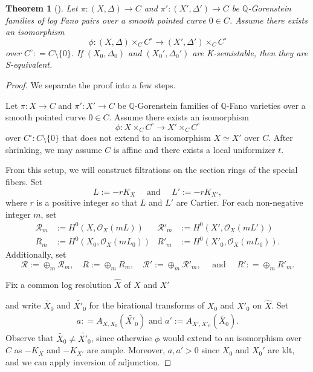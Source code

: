 \documentclass[12pt,reqno]{amsart}%
\newcommand{\cR}{{\mathcal{R}}}
\newtheorem{thm}{Theorem}[section]
\theoremstyle{definition}
\theoremstyle{remark}
\newcommand{\cO}{{\mathcal{O}}}
\newcommand{\Q}{{\mathbb{Q}}}
\begin{document}
\begin{thm}[{\cite{BX19}}]\label{t-main}
Let $\pi: (X,\Delta) \to C$ and $\pi': (X',\Delta')\to C$ be $\Q$-Gorenstein families of log Fano pairs over a smooth pointed curve $0 \in C$. Assume there exists an  isomorphism
\[
\phi: (X,\Delta) \times_C C^\circ  \to (X',\Delta') \times_C C^\circ
\] 
over $C^\circ\colon = C\setminus \{0 \}$.
If $(X_0,\Delta_0)$ and $(X_0',\Delta_0')$ are K-semistable, then they are S-equivalent.
\end{thm}
\begin{proof}We separate the proof into a few steps.
\medskip



Let  $\pi: X \to C$ and  $\pi': X'\to C$
 be $\Q$-Gorenstein families of  $\mathbb{Q}$-Fano varieties over a smooth pointed curve $0 \in C$.  
Assume there exists an isomorphism 
\[
\phi: X \times_C C^\circ  \to X' \times_C C^\circ
\] 
over $C^\circ: C\setminus \{0 \}$ that does not extend to an isomorphism $X \simeq X'$ over $C$. 
After shrinking, we may assume $C$ is affine and there exists a local uniformizer $t$. 

 From this setup, we will construct filtrations on the section rings of the special fibers. 
Set 
\[L := -rK_X
\quad \text{ and } \quad
L':=-rK_{X'},
\]
where $r$ is a positive integer so that $L$ and $L'$ are Cartier. 
For each non-negative integer $m$, set
\begin{align*}
\cR_m &:=H^0(X, \cO_X(mL))   
 & \cR'_{m} &:=  H^0(X', \cO_X(mL') )\\
R_m &:= H^0(X_0,  \cO_X(mL_0) )
& R'_m&:= H^0(X'_0, \cO_X(mL_0) ). 
\end{align*} 
Additionally, set  
$$\cR:= \displaystyle  \oplus_{ m} \cR_m, 
\quad 
R:= \displaystyle  \oplus_{ m} R_m,
\quad
\cR':= \displaystyle  \oplus_{ m} \cR'_m, 
\quad \text{ and } \quad 
R': = \displaystyle \oplus_{ m} R'_m.$$

Fix a common log resolution $\widehat{X}$ of $X$ and $X'$ 
\begin{center}
   \end{center}
   and write $\widetilde{X_0}$ and $\widetilde{X'_0}$ for the birational transforms of $X_0$ and $X'_0$ on $\widehat{X}$. 
 Set 
 \begin{eqnarray}\label{e-defa}
a: = A_{X,X_0}(\widetilde{X'_0}) \mbox{\ \ \ and \ \ \ }a' := A_{X', X'_0 }(\widetilde{X_0}).
\end{eqnarray}
Observe that  $\widetilde{X_0}\neq \widetilde{X'_0}$, since otherwise $\phi$ would extend to an isomorphism over $C$ as $-K_{X}$ and $-K_{X'}$ are ample. Moreover, $a, a'>0$ since $X_0$ and $X_0'$ are klt, and we can apply inversion of adjunction. 


\end{proof}
\end{document}
